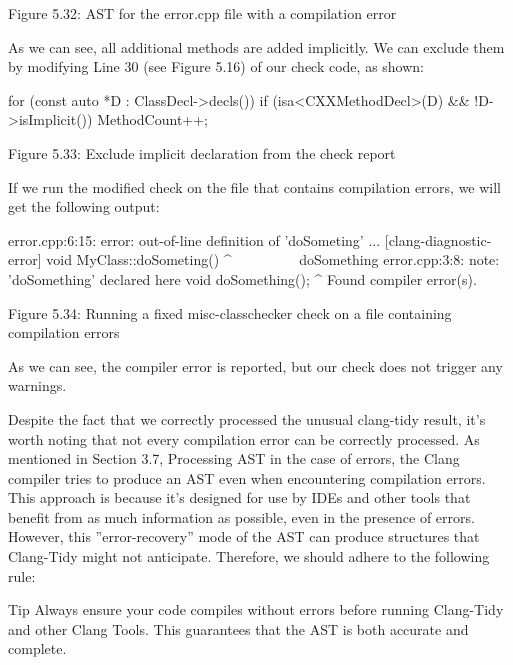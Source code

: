 \begin{center}
Figure 5.32: AST for the error.cpp file with a compilation error
\end{center}

As we can see, all additional methods are added implicitly. We can exclude them by modifying Line 30 (see Figure 5.16) of our check code, as shown:

\begin{cpp}
for (const auto *D : ClassDecl->decls()) {
  if (isa<CXXMethodDecl>(D) && !D->isImplicit())
    MethodCount++;
}
\end{cpp}


\begin{center}
Figure 5.33: Exclude implicit declaration from the check report
\end{center}

If we run the modified check on the file that contains compilation errors, we will get the following output:

\begin{shell}
error.cpp:6:15: error: out-of-line definition of ’doSometing’ ...
[clang-diagnostic-error]
void MyClass::doSometing() {}
              ^~~~~~~~~~
doSomething
error.cpp:3:8: note: ’doSomething’ declared here
  void doSomething();
       ^
Found compiler error(s).
\end{shell}

\begin{center}
Figure 5.34: Running a fixed misc-classchecker check on a file containing compilation errors
\end{center}

As we can see, the compiler error is reported, but our check does not trigger any warnings.

Despite the fact that we correctly processed the unusual clang-tidy result, it’s worth noting that not every compilation error can be correctly processed. As mentioned in Section 3.7, Processing AST in the case of errors, the Clang compiler tries to produce an AST even when encountering compilation errors. This approach is because it’s designed for use by IDEs and other tools that benefit from as much information as possible, even in the presence of errors. However, this ”error-recovery” mode of the AST can produce structures that Clang-Tidy might not anticipate. Therefore, we should adhere to the following rule:


\begin{myTip}{Tip}
Always ensure your code compiles without errors before running Clang-Tidy and other Clang Tools. This guarantees that the AST is both accurate and complete.
\end{myTip}


